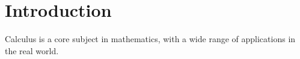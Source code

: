 \chapter{Introduction}
Calculus is a core subject in mathematics, with a wide range of applications in the real world. 